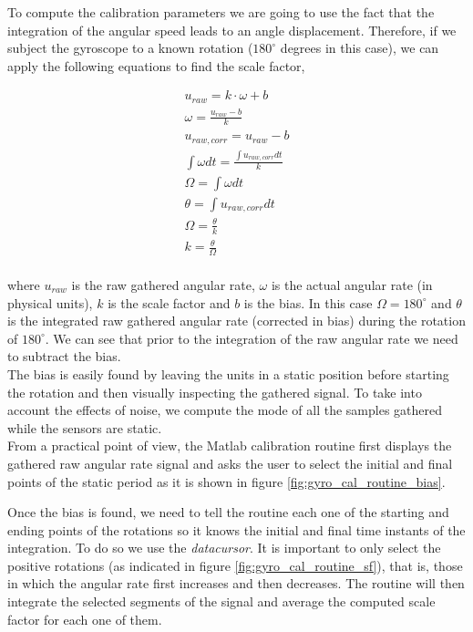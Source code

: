 \indent To compute the calibration parameters we are going to use the fact that the integration of the angular speed leads to an angle displacement. Therefore, if we subject the gyroscope to a known rotation ($180^{\circ}$ degrees in this case), we can apply the following equations to find the scale factor,

\begin{gather}
u_{raw} = k\cdot \omega + b \label{eq:gyro_cal1}\\
\omega = \frac{u_{raw}-b}{k} \label{eq:gyro_cal2}\\
u_{raw,corr} = u_{raw}-b \label{eq:gyro_cal3}\\
\int{\omega dt} = \frac{\int{u_{raw,corr} dt}}{k} \label{eq:gyro_cal4}\\
\Omega = \int{\omega dt} \label{eq:gyro_cal5}\\
\theta = \int{u_{raw,corr} dt} \label{eq:gyro_cal6}\\
\Omega = \frac{\theta}{k} \label{eq:gyro_cal7}\\
k = \frac{\theta}{\Omega} \label{eq:gyro_cal8}\\
\end{gather}

\noindent where $u_{raw}$ is the raw gathered angular rate, $\omega$ is the actual angular rate (in physical units), $k$ is the scale factor and $b$ is the bias. In this case $\Omega = 180^{\circ}$ and $\theta$ is the integrated raw gathered angular rate (corrected in bias) during the rotation of $180^{\circ}$. We can see that prior to the integration of the raw angular rate we need to subtract the bias. \\

The bias is easily found by leaving the units in a static position before starting the rotation and then visually inspecting the gathered signal. To take into account the effects of noise, we compute the mode of all the samples gathered while the sensors are static. \\

From a practical point of view, the Matlab calibration routine first displays the gathered raw angular rate signal and asks the user to select the initial and final points of the static period as it is shown in figure \ref{fig:gyro_cal_routine_bias}.

Once the bias is found, we need to tell the routine each one of the starting and ending points of the rotations so it knows the initial and final time instants of the integration. To do so we use the \textit{datacursor}. It is important to only select the positive rotations (as indicated in figure \ref{fig:gyro_cal_routine_sf}), that is, those in which the angular rate first increases and then decreases. The routine will then integrate the selected segments of the signal and average the computed scale factor for each one of them. 

